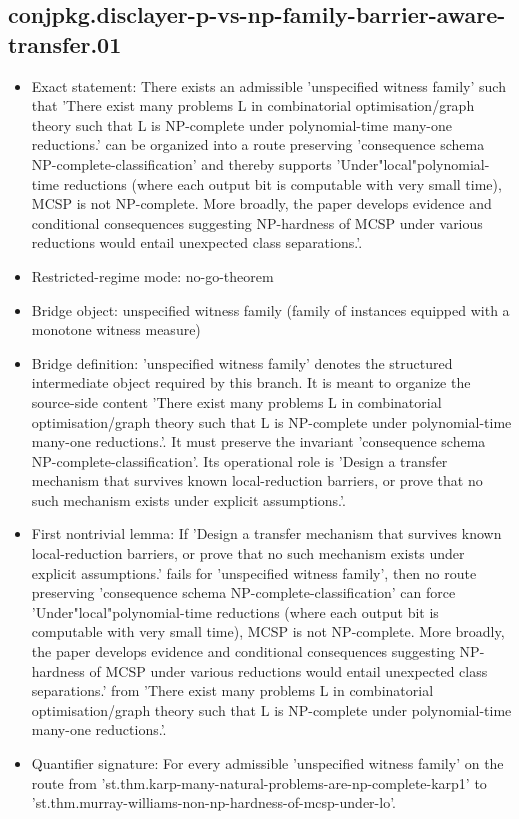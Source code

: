 \documentclass[11pt]{article}
\begin{document}
\subsection*{conjpkg.disclayer-p-vs-np-family-barrier-aware-transfer.01}
\begin{itemize}
\item Exact statement: There exists an admissible 'unspecified witness family' such that 'There exist many problems L in combinatorial optimisation/graph theory such that L is NP-complete under polynomial-time many-one reductions.' can be organized into a route preserving 'consequence schema NP-complete-classification' and thereby supports 'Under"local"polynomial-time reductions (where each output bit is computable with very small time), MCSP is not NP-complete. More broadly, the paper develops evidence and conditional consequences suggesting NP-hardness of MCSP under various reductions would entail unexpected class separations.'.
\item Restricted-regime mode: no-go-theorem
\item Bridge object: unspecified witness family (family of instances equipped with a monotone witness measure)
\item Bridge definition: 'unspecified witness family' denotes the structured intermediate object required by this branch. It is meant to organize the source-side content 'There exist many problems L in combinatorial optimisation/graph theory such that L is NP-complete under polynomial-time many-one reductions.'. It must preserve the invariant 'consequence schema NP-complete-classification'. Its operational role is 'Design a transfer mechanism that survives known local-reduction barriers, or prove that no such mechanism exists under explicit assumptions.'.
\item First nontrivial lemma: If 'Design a transfer mechanism that survives known local-reduction barriers, or prove that no such mechanism exists under explicit assumptions.' fails for 'unspecified witness family', then no route preserving 'consequence schema NP-complete-classification' can force 'Under"local"polynomial-time reductions (where each output bit is computable with very small time), MCSP is not NP-complete. More broadly, the paper develops evidence and conditional consequences suggesting NP-hardness of MCSP under various reductions would entail unexpected class separations.' from 'There exist many problems L in combinatorial optimisation/graph theory such that L is NP-complete under polynomial-time many-one reductions.'.
\item Quantifier signature: For every admissible 'unspecified witness family' on the route from 'st.thm.karp-many-natural-problems-are-np-complete-karp1' to 'st.thm.murray-williams-non-np-hardness-of-mcsp-under-lo'.

\end{itemize}
\end{document}
